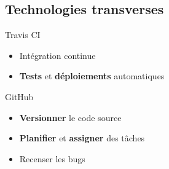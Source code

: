 \documentclass{beamer} %
\begin{document}
  \subsection{Technologies transverses}
  \begin{frame}{\subsecname}
    \begin{block}{Travis CI}
      \begin{itemize}
        \item Intégration continue
        \item \textbf{Tests} et \textbf{déploiements} automatiques
      \end{itemize}
    \end{block}

    \begin{block}{GitHub}
      \begin{itemize}
        \item \textbf{Versionner} le code source
        \item \textbf{Planifier} et \textbf{assigner} des tâches
        \item Recenser les bugs
      \end{itemize}
    \end{block}
    
  \end{frame}
\end{document}

